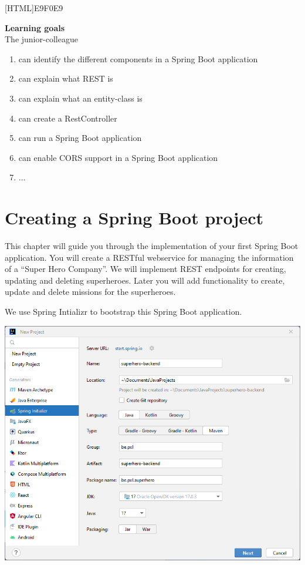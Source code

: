 \documentclass[a4paper, 12pt]{report}
\begin{document}
[HTML]{E9F0E9}{\parbox{\textwidth}{%
\noindent \textbf{Learning goals}\\
The junior-colleague
\begin{enumerate}[nolistsep]
\item can identify the different components in a Spring Boot application
\item can explain what REST is
\item can explain what an entity-class is
\item can create a RestController
\item can run a Spring Boot application
\item can enable CORS support in a Spring Boot application
\item ...
\end{enumerate}}}


\section{Creating a Spring Boot project}

This chapter will guide you through the implementation of your first Spring Boot application. You will create a RESTful webservice for managing the information of a ``Super Hero Company''. We will implement REST endpoints for creating, updating and deleting superheroes. Later you will add functionality to create, update and delete missions for the superheroes.

We use Spring Intializr to bootstrap this Spring Boot application. 

\includegraphics[width=\textwidth]{./images/chapter2/new_project.png} 
\end{document}

